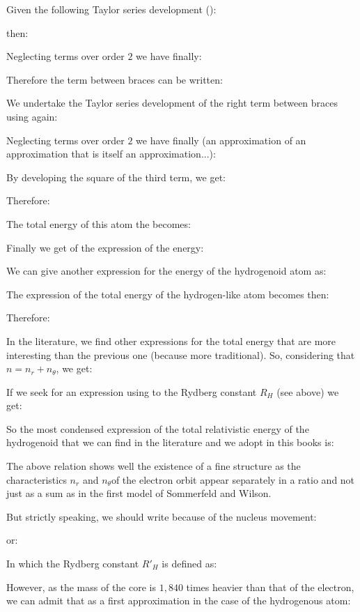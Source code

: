 	Given the following Taylor series development ():
	
	then:
	
	Neglecting terms over order $2$ we have finally:
	
	Therefore the term between braces can be written:
	
	We undertake the Taylor series development of the right term between braces using again:
	
	Neglecting terms over order $2$ we have finally (an approximation of an approximation that is itself an approximation...):
	
	By developing the square of the third term, we get:
	
	Therefore:
	
	The total energy of this atom the becomes:
	
	Finally we get of the expression of the energy:
	
	We can give another expression for the energy of the hydrogenoid atom as:
	
	The expression of the total energy of the hydrogen-like atom becomes then:
	
	Therefore:
	
	In the literature, we find other expressions for the total energy that are more interesting than the previous one (because more traditional). So, considering that $n=n_r+n_\theta$, we get:
	
	If we seek for an expression using to the Rydberg constant $R_H$ (see above) we get:
	
	So the most condensed expression of the total relativistic energy of the hydrogenoid  that we can find in the literature and we adopt in this books is:
	
	The above relation shows well the existence of a fine structure as the characteristics $n_r$ and $n_\theta$of the electron orbit appear separately in a ratio and not just as a sum as in the first model of Sommerfeld and Wilson.
	
	But strictly speaking, we should write because of the nucleus movement:
	
	or:
	
	In which the Rydberg constant ${R'}_H$ is defined as:
	
	However, as the mass of the core is $1,840$ times heavier than that of the electron, we can admit that as a first approximation in the case of the hydrogenous atom:
	
